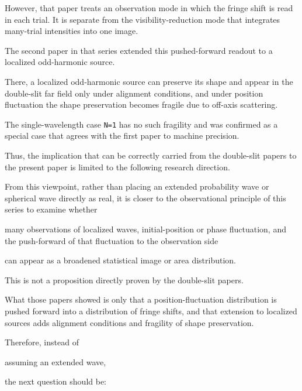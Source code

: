 \documentclass[
]{article}
\newenvironment{Shaded}{}{}
\newcommand{\NormalTok}[1]{#1}
\begin{document}
However, that paper treats an observation mode in which the fringe shift
is read in each trial. It is separate from the visibility-reduction mode
that integrates many-trial intensities into one image.

The second paper in that series extended this pushed-forward readout to
a localized odd-harmonic source.

There, a localized odd-harmonic source can preserve its shape and appear
in the double-slit far field only under alignment conditions, and under
position fluctuation the shape preservation becomes fragile due to
off-axis scattering.

The single-wavelength case \texttt{N=1} has no such fragility and was
confirmed as a special case that agrees with the first paper to machine
precision.

Thus, the implication that can be correctly carried from the double-slit
papers to the present paper is limited to the following research
direction.

From this viewpoint, rather than placing an extended probability wave or
spherical wave directly as real, it is closer to the observational
principle of this series to examine whether

\begin{Shaded}
\begin{Highlighting}[]
\NormalTok{many observations of localized waves,}
\NormalTok{initial{-}position or phase fluctuation,}
\NormalTok{and the push{-}forward of that fluctuation to the observation side}
\end{Highlighting}
\end{Shaded}

can appear as a broadened statistical image or area distribution.

This is not a proposition directly proven by the double-slit papers.

What those papers showed is only that a position-fluctuation
distribution is pushed forward into a distribution of fringe shifts, and
that extension to localized sources adds alignment conditions and
fragility of shape preservation.

Therefore, instead of

\begin{Shaded}
\begin{Highlighting}[]
\NormalTok{assuming an extended wave,}
\end{Highlighting}
\end{Shaded}

the next question should be:
\end{document}
